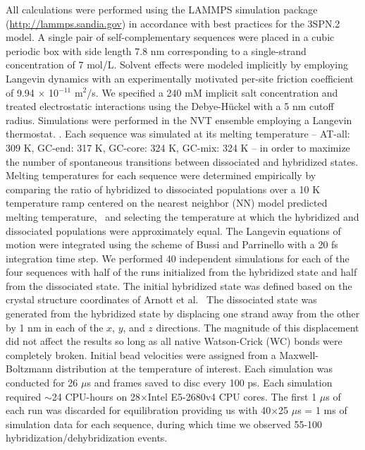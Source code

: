 \documentclass[journal=jpcbfk,manuscript=article]{achemso}
\begin{document}
All calculations were performed using the LAMMPS simulation package (\url{http://lammps.sandia.gov}) in accordance with best practices for the 3SPN.2 model. \citep{Plimpton1997FastDynamics} A single pair of self-complementary sequences were placed in a cubic periodic box with side length 7.8 nm corresponding to a single-strand concentration of 7 mol/L. Solvent effects were modeled implicitly by employing Langevin dynamics \citep{DunwegB.Paul1991BrownianNumbers., Bussi2007AccurateDynamics} with an experimentally motivated per-site friction coefficient of 9.94 $\times$ 10$^{-11}$ m$^2$/s. \citep{Nkodo2001DiffusionElectrophoresis, Hinckley2013AnHybridization} We specified a 240 mM implicit salt concentration and treated electrostatic interactions using the Debye-H{\"u}ckel with a 5 nm cutoff radius. \citep{Debye1923ZurElektrolyte} Simulations were performed in the NVT ensemble employing a Langevin thermostat. \citep{Schneider1978Molecular-dynamicsTransitions}. Each sequence was simulated at its melting temperature -- AT-all: 309 K, GC-end: 317 K, GC-core: 324 K, GC-mix: 324 K -- in order to maximize the number of spontaneous transitions between dissociated and hybridized states. Melting temperatures for each sequence were determined empirically by comparing the ratio of hybridized to dissociated populations over a 10 K temperature ramp centered on the nearest neighbor (NN) model predicted melting temperature,~\citep{SantaLucia1998AThermodynamics, Santalucia2004TheMotifs} and selecting the temperature at which the hybridized and dissociated populations were approximately equal. The Langevin equations of motion were integrated using the scheme of Bussi and Parrinello \citep{Bussi2007AccurateDynamics} with a 20 fs integration time step. We performed 40 independent simulations for each of the four sequences with half of the runs initialized from the hybridized state and half from the dissociated state. The initial hybridized state was defined based on the crystal structure coordinates of Arnott et al.~\citep{Arnott1976CRCBiology} The dissociated state was generated from the hybridized state by displacing one strand away from the other by 1 nm in each of the $x$, $y$, and $z$ directions. The magnitude of this displacement did not affect the results so long as all native Watson-Crick (WC) bonds were completely broken. Initial bead velocities were assigned from a Maxwell-Boltzmann distribution at the temperature of interest. Each simulation was conducted for 26 $\mu$s and frames saved to disc every 100 ps. Each simulation required $\sim$24 CPU-hours on 28$\times$Intel E5-2680v4 CPU cores. The first 1 $\mu$s of each run was discarded for equilibration providing us with 40$\times$25 $\mu$s = 1 ms of simulation data for each sequence, during which time we observed 55-100 hybridization/dehybridization events.
\end{document}
